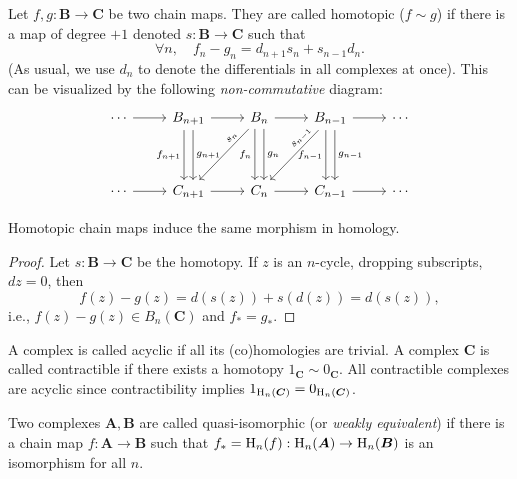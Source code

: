 \begin{defn}
    Let $f,g:\bm{B}\to \bm{C}$ be two chain maps. They are called homotopic ($f\sim g$) if there is a map of degree $+1$ denoted $s:\bm{B}\to \bm{C}$ such that 
    \[\forall n,\quad f_n-g_n=d_{n+1}s_n+s_{n-1}d_n.\]
    (As usual, we use $d_n$ to denote the differentials in all complexes at once).
    This can be visualized by the following \emph{non-commutative} diagram:
     \[\begin{tikzcd}
        \cdots\ar[r] & B_{n+1}\ar[r]\ar[dd,swap, xshift=-.75ex,"f_{n+1}"]\ar[dd,xshift=.75ex,"g_{n+1}"] & B_{n} \arrow[r]\ar[dd,swap,xshift=-.75ex,"f_n"]\ar[dd,xshift=.75ex,"g_n"]\ar[ddl,sloped, near start,"s_n"] & B_{n-1}\ar[dd,swap,xshift=-.75ex,"f_{n-1}"]\ar[dd,xshift=.75ex,"g_{n-1}"]\ar[r]\ar[ddl, near start,sloped,"s_{n-1}"] & \cdots \\
        &&&&\\
       \cdots\ar[r] & C_{n+1}\ar[r] & C_n\ar[r] &C_{n-1} \ar[r] &\cdots
    \end{tikzcd}\]
\end{defn}

\begin{thm}
    Homotopic chain maps induce the same morphism in homology.
\end{thm}
\begin{proof}
     Let $s:\bm{B}\to\bm{C}$ be the homotopy. If $z$ is an $n$-cycle, dropping subscripts, $d z=0$, then
     \[f(z)-g(z)=d(s(z))+s(d(z))=d(s(z)),\]
     i.e., $f(z)-g(z)\in B_n(\bm{C})$ and $f_\ast=g_\ast$.
\end{proof}

\begin{defn}
    A complex is called acyclic if all its (co)homologies are trivial. A complex $\bm{C}$ is called contractible if there exists a homotopy $1_{\bm{C}}\sim 0_{\bm{C}}$. 
    All contractible complexes are acyclic since contractibility implies $1_{\mathrm{H}_n(\boldsymbol{C})}=0_{\mathrm{H}_n(\boldsymbol{C})}$.
\end{defn}

\begin{defn}
    Two complexes $\bm{A},\bm{B}$ are called quasi-isomorphic (or \emph{weakly equivalent}) if there is a chain map $f:\bm{A}\to \bm{B}$ such that $f_\ast=\mathrm{H}_n(f):\mathrm{H}_n(\boldsymbol{A})\to \mathrm{H}_n(\boldsymbol{B})$ is an isomorphism for all $n$.
\end{defn}

